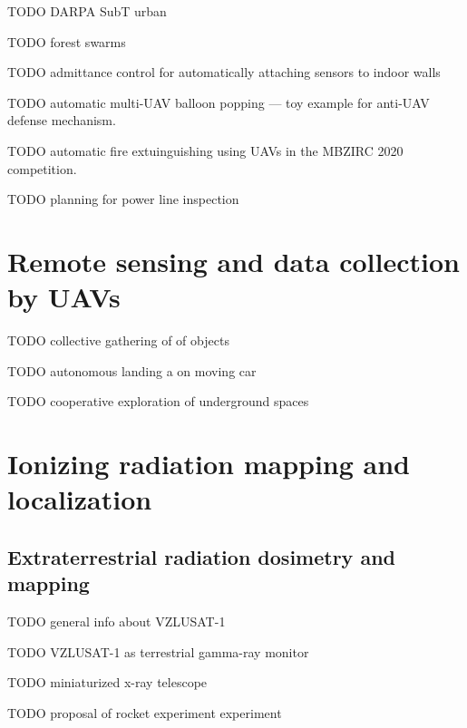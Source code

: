 \documentclass[a4paper,11pt,titlepage,twoside]{book}
\newcommand{\todo}[1]{{\color{red} TODO {#1}}}
\begin{document}

\todo{DARPA SubT urban}
\cite{kratky2020autonomous2} %

\todo{forest swarms}
\cite{dmytruk2020safe}
\cite{ahmad2020autonomous}

\todo{admittance control for automatically attaching sensors to indoor walls}
\cite{smrcka2020admittance}

\todo{automatic multi-UAV balloon popping --- toy example for anti-UAV defense mechanism.}
\cite{stasinchuk2020multiuav}

\todo{automatic fire extuinguishing using UAVs in the MBZIRC 2020 competition.}
\cite{walter2020extinguishing}

\todo{planning for power line inspection}
\cite{silano2020power}

\section{Remote sensing and data collection by UAVs}

\todo{collective gathering of of objects}
\cite{spurny2019cooperative}
\cite{loianno2018localization}

\todo{autonomous landing a on moving car}
\cite{baca2017autonomous}
\cite{baca2019autonomous}

\todo{cooperative exploration of underground spaces}
\cite{roucek2019darpa}
\cite{petrlik2020robust}

\section{Ionizing radiation mapping and localization}

\subsection{Extraterrestrial radiation dosimetry and mapping}

\todo{general info about VZLUSAT-1}
\cite{urban2017vzlusat} %
\cite{daniel2019inorbit} %

\todo{VZLUSAT-1 as terrestrial gamma-ray monitor}
\cite{daniel2016terrestrial}

\todo{miniaturized x-ray telescope}
\cite{baca2016miniaturized}
\cite{baca2018timepix} %

\todo{proposal of rocket experiment experiment}
\cite{daniel2017xray}
\end{document}
